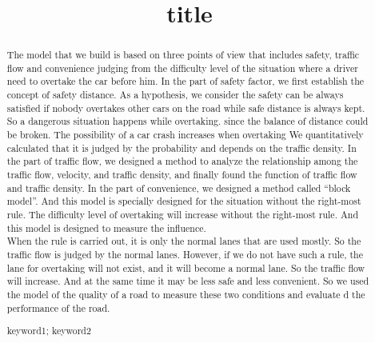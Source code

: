 \documentclass[a4paper, 11pt]{article}
\title{title}
\begin{document}
\begin{abstract}
The model that we build is based on three points of view that includes safety, traffic flow and convenience judging from the difficulty level of the situation where a driver need to overtake the car before him.
In the part of safety factor, we first establish the concept of safety distance. As a hypothesis, we consider the safety can be always satisfied if nobody overtakes other cars on the road while safe distance is always kept. So a dangerous situation happens while overtaking. 
since the balance of distance could be broken. The possibility of a car crash increases when overtaking
We quantitatively calculated that it is judged by the probability and depends on the traffic density. 
In the part of traffic flow, we designed a method to analyze the relationship among the traffic flow, velocity, and traffic density, and finally found the function of traffic flow and traffic density. 
In the part of convenience, we designed a method called “block model”. And this model is specially designed for the situation without the right-most rule. The difficulty level of overtaking will increase without the right-most rule. And this model is designed to measure the influence.\\
When the rule is carried out, it is only the normal lanes that are used mostly. So the traffic flow is judged by the normal lanes. However, if we do not have such a rule, the lane for overtaking will not exist, and it will become a normal lane. So the traffic flow will increase. And at the same time it may be less safe and less convenient. So we used the model of the quality of a road to measure these two conditions and evaluate d the performance of the road. 


\begin{keywords}
keyword1; keyword2
\end{keywords}
\end{abstract}
\maketitle
\pagestyle{empty}
\newpage
\tableofcontents
\newpage
\pagestyle{fancy}

\end{document}
